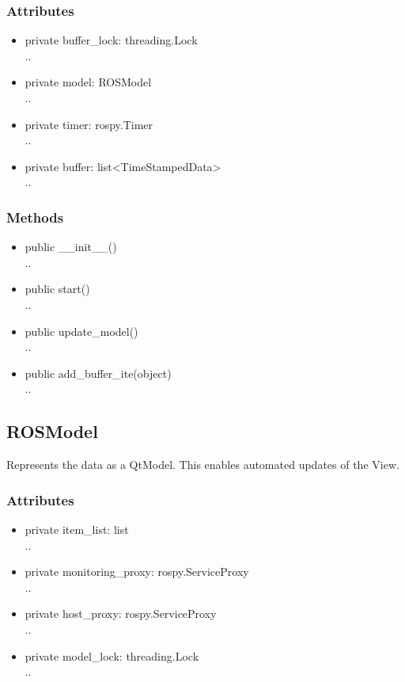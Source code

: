 \subsubsection{Attributes}
\begin{itemize}
  \item private buffer\_lock: threading.Lock\\
  ..
  \item private model: ROSModel\\
  ..
  \item private timer: rospy.Timer\\
  ..
  \item private buffer: list<TimeStampedData>\\
  ..
\end{itemize}
\subsubsection{Methods}
\begin{itemize}
  \item public \_\_init\_\_()\\
  ..
  \item public start()\\
  ..
  \item public update\_model()\\
  ..
  \item public add\_buffer\_ite(object)\\
  ..
\end{itemize}

\subsection{ROSModel}
Represents the data as a QtModel. This enables automated updates of the View.
\subsubsection{Attributes}
\begin{itemize}
  \item private item\_list: list\\
  ..
  \item private monitoring\_proxy: rospy.ServiceProxy\\
  ..
  \item private host\_proxy: rospy.ServiceProxy\\
  ..  
  \item private model\_lock: threading.Lock\\
  ..
\end{itemize}
